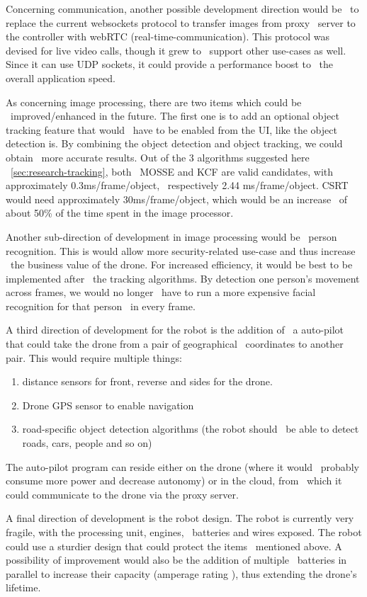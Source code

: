 Concerning communication, another possible development direction would be \
to replace the current websockets protocol to transfer images from proxy \
server to the controller with webRTC (real-time-communication).
This protocol was devised for live video calls, though it grew to \
support other use-cases as well.
Since it can use UDP sockets, it could provide a performance boost to \
the overall application speed.


As concerning image processing, there are two items which could be \
improved/enhanced in the future.
The first one is to add an optional object tracking feature that would \
have to be enabled from the UI, like the object detection is.
By combining the object detection and object tracking, we could obtain \
more accurate results.
Out of the 3 algorithms suggested here ~\ref{sec:research-tracking}, both \
MOSSE and KCF are valid candidates, with approximately 0.3ms/frame/object, \
respectively 2.44 ms/frame/object.
CSRT would need approximately 30ms/frame/object, which would be an increase \
of about 50\% of the time spent in the image processor.

Another sub-direction of development in image processing would be \
person recognition.
This is would allow more security-related use-case and thus increase \
the business value of the drone.
For increased efficiency, it would be best to be implemented after \
the tracking algorithms.
By detection one person's movement across frames, we would no longer \
have to run a more expensive facial recognition for that person \
in every frame.

A third direction of development for the robot is the addition of \
a auto-pilot that could take the drone from a pair of geographical \
coordinates to another pair.
This would require multiple things:
\begin{enumerate}
    \item distance sensors for front, reverse and sides for the drone.
    \item Drone GPS sensor to enable navigation
    \item road-specific object detection algorithms (the robot should \
            be able to detect roads, cars, people and so on)
\end{enumerate}
The auto-pilot program can reside either on the drone (where it would \
probably consume more power and decrease autonomy) or in the cloud, from \
which it could communicate to the drone via the proxy server.

A final direction of development is the robot design.
The robot is currently very fragile, with the processing unit, engines, \
batteries and wires exposed.
The robot could use a sturdier design that could protect the items \
mentioned above.
A possibility of improvement would also be the addition of multiple \
batteries in parallel to increase their capacity (amperage rating ),
thus extending the drone's lifetime.



%
